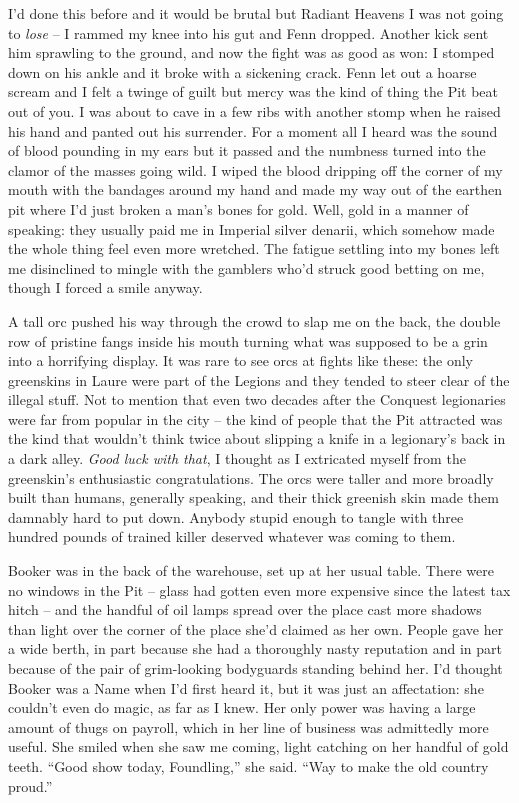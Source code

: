 \documentclass[12pt, openany]{book}
\begin{document}
I’d done this before and it would be brutal but Radiant Heavens I was not going to \textit{lose} – I rammed my knee into his gut and Fenn dropped. Another kick sent him sprawling to the ground, and now the fight was as good as won: I stomped down on his ankle and it broke with a sickening crack. Fenn let out a hoarse scream and I felt a twinge of guilt but mercy was the kind of thing the Pit beat out of you. I was about to cave in a few ribs with another stomp when he raised his hand and panted out his surrender. For a moment all I heard was the sound of blood pounding in my ears but it passed and the numbness turned into the clamor of the masses going wild. I wiped the blood dripping off the corner of my mouth with the bandages around my hand and made my way out of the earthen pit where I’d just broken a man’s bones for gold. Well, gold in a manner of speaking: they usually paid me in Imperial silver denarii, which somehow made the whole thing feel even more wretched. The fatigue settling into my bones left me disinclined to mingle with the gamblers who’d struck good betting on me, though I forced a smile anyway. 

A tall orc pushed his way through the crowd to slap me on the back, the double row of pristine fangs inside his mouth turning what was supposed to be a grin into a horrifying display. It was rare to see orcs at fights like these: the only greenskins in Laure were part of the Legions and they tended to steer clear of the illegal stuff. Not to mention that even two decades after the Conquest legionaries were far from popular in the city – the kind of people that the Pit attracted was the kind that wouldn’t think twice about slipping a knife in a legionary’s back in a dark alley. \textit{Good luck with that}, I thought as I extricated myself from the greenskin’s enthusiastic congratulations. The orcs were taller and more broadly built than humans, generally speaking, and their thick greenish skin made them damnably hard to put down. Anybody stupid enough to tangle with three hundred pounds of trained killer deserved whatever was coming to them.

Booker was in the back of the warehouse, set up at her usual table. There were no windows in the Pit – glass had gotten even more expensive since the latest tax hitch – and the handful of oil lamps spread over the place cast more shadows than light over the corner of the place she’d claimed as her own. People gave her a wide berth, in part because she had a thoroughly nasty reputation and in part because of the pair of grim-looking bodyguards standing behind her. I’d thought Booker was a Name when I’d first heard it, but it was just an affectation: she couldn’t even do magic, as far as I knew. Her only power was having a large amount of thugs on payroll, which in her line of business was admittedly more useful. She smiled when she saw me coming, light catching on her handful of gold teeth. “Good show today, Foundling,” she said. “Way to make the old country proud.”
\end{document}
